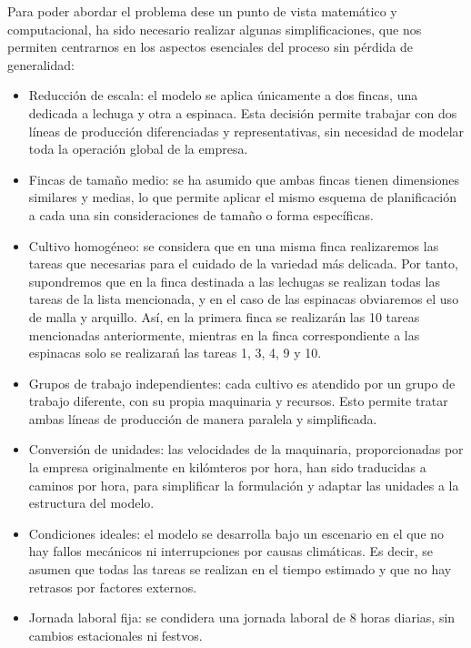 Para poder abordar el problema dese un punto de vista matemático y computacional, ha sido necesario realizar algunas simplificaciones, que nos permiten centrarnos en los aspectos esenciales del proceso
sin pérdida de generalidad:
\begin{itemize}
    \item Reducción de escala: el modelo se aplica únicamente a dos fincas, una dedicada a lechuga y otra a espinaca. 
          Esta decisión permite trabajar con dos líneas de producción diferenciadas y representativas, sin necesidad de modelar toda la operación global de la empresa.
    \item Fincas de tamaño medio: se ha asumido que ambas fincas tienen dimensiones similares y medias, lo que permite aplicar el mismo esquema de planificación
          a cada una sin consideraciones de tamaño o forma específicas.
    \item Cultivo homogéneo: se considera que en una misma finca realizaremos las tareas que necesarias para el cuidado de la variedad más delicada. 
          Por tanto, supondremos que en la finca destinada a las lechugas se realizan todas las tareas de la lista mencionada, y en el caso de las espinacas obviaremos el uso de malla y arquillo. 
          Así, en la primera finca se realizarán las 10 tareas mencionadas anteriormente, mientras en la finca correspondiente a las espinacas solo se realizarań las tareas 1, 3, 4, 9 y 10.
    \item Grupos de trabajo independientes: cada cultivo es atendido por  un grupo de trabajo diferente, con su propia maquinaria y recursos.
          Esto permite tratar ambas líneas de producción de manera paralela y simplificada.
    \item Conversión de unidades: las velocidades de la maquinaria, proporcionadas por la empresa originalmente en kilómteros por hora, han sido traducidas a caminos por hora,
          para simplificar la formulación y adaptar las unidades a la estructura del modelo.
    \item Condiciones ideales: el modelo se desarrolla bajo un escenario en el que no hay fallos mecánicos ni interrupciones por causas climáticas.
          Es decir, se asumen que todas las tareas se realizan en el tiempo estimado y que no hay retrasos por factores externos.
    \item Jornada laboral fija: se condidera una jornada laboral de 8 horas diarias, sin cambios estacionales ni festvos.
\end{itemize}
 
